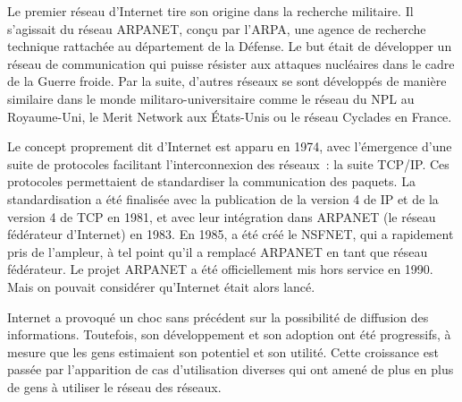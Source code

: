 Le premier réseau d'Internet tire son origine dans la recherche militaire. Il s'agissait du réseau ARPANET, conçu par l'ARPA, une agence de recherche technique rattachée au département de la Défense. Le but était de développer un réseau de communication qui puisse résister aux attaques nucléaires dans le cadre de la Guerre froide. Par la suite, d'autres réseaux se sont développés de manière similaire dans le monde militaro-universitaire comme le réseau du NPL au Royaume-Uni, le Merit Network aux États-Unis ou le réseau Cyclades en France.

Le concept proprement dit d'Internet est apparu en 1974, avec l'émergence d'une suite de protocoles facilitant l'interconnexion des réseaux~: la suite TCP/IP. Ces protocoles permettaient de standardiser la communication des paquets. La standardisation a été finalisée avec la publication de la version 4 de IP et de la version 4 de TCP en 1981, et avec leur intégration dans ARPANET (le réseau fédérateur d'Internet) en 1983. En 1985, a été créé le NSFNET, qui a rapidement pris de l'ampleur, à tel point qu'il a remplacé ARPANET en tant que réseau fédérateur. Le projet ARPANET a été officiellement mis hors service en 1990. Mais on pouvait considérer qu'Internet était alors lancé.


Internet a provoqué un choc sans précédent sur la possibilité de diffusion des informations. Toutefois, son développement et son adoption ont été progressifs, à mesure que les gens estimaient son potentiel et son utilité. Cette croissance est passée par l'apparition de cas d'utilisation diverses qui ont amené de plus en plus de gens à utiliser le réseau des réseaux.

